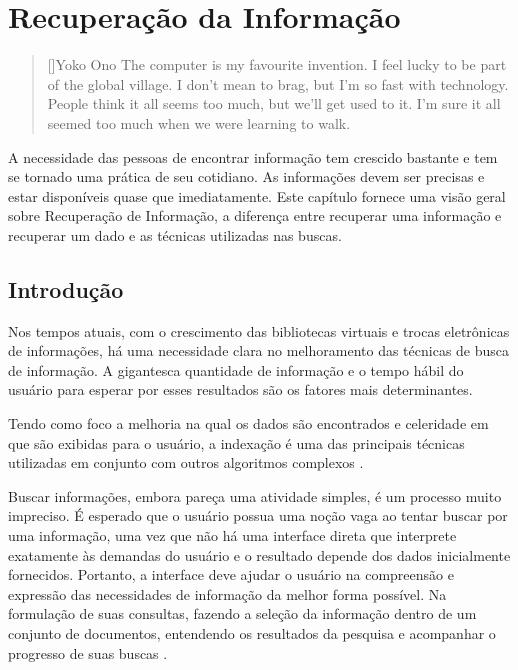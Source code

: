 \chapter{Recuperação da Informação}
\label{cap:informationretrieval}

\begin{quotation}[]{Yoko Ono}
The computer is my favourite invention. I feel lucky to be part of the global village. I don't mean to brag, but I'm so fast with technology. People think it all seems too much, but we'll get used to it. I'm sure it all seemed too much when we were learning to walk.
\end{quotation}

A necessidade das pessoas de encontrar informação tem crescido bastante e tem se tornado uma prática de seu cotidiano. As informações devem ser precisas e estar disponíveis quase que imediatamente. Este capítulo fornece uma visão geral sobre Recuperação de Informação, a diferença entre recuperar uma informação e recuperar um dado e as técnicas utilizadas nas buscas.

\section{Introdução}

Nos tempos atuais, com o crescimento das bibliotecas virtuais e trocas eletrônicas de informações, há uma necessidade clara no melhoramento das técnicas de busca de informação. A gigantesca quantidade de informação e o tempo hábil do usuário para esperar por esses resultados são os fatores mais determinantes. 

Tendo como foco a melhoria na qual os dados são encontrados e celeridade em que são exibidas para o usuário, a indexação é uma das principais técnicas utilizadas em conjunto com outros algoritmos complexos \cite{Fred2008}.

Buscar informações, embora pareça uma atividade simples, é um processo muito impreciso. É esperado que o usuário possua uma noção vaga ao tentar buscar por uma informação, uma vez que não há uma interface direta que interprete exatamente às demandas do usuário e o resultado depende dos dados inicialmente fornecidos. Portanto, a interface deve ajudar o usuário na compreensão e expressão das necessidades de informação da melhor forma possível. Na formulação de suas consultas, fazendo a seleção da informação dentro de um conjunto de documentos, entendendo os resultados da pesquisa e acompanhar o progresso de suas buscas \cite{Baeza-Yates1999}.


